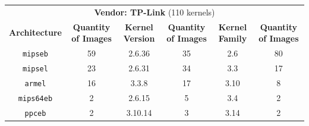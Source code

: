 \begin{table}[h]
{\begin{tabular}{cccccc}
\multicolumn{6}{c}{\textbf{Vendor: TP-Link} (110 kernels)}                                                                    \\
\textbf{Architecture} & \multicolumn{1}{c|}{\textbf{Quantity of Images}} & \textbf{Kernel Version} & \multicolumn{1}{c|}{\textbf{Quantity of Images}} & \textbf{Kernel Family} & \textbf{Quantity of Images} \\ \hline
{\tt mipseb}            & \multicolumn{1}{c|}{59}                & 2.6.36                  & \multicolumn{1}{c|}{35}                          & 2.6                     & 80                         \\
{\tt mipsel}            & \multicolumn{1}{c|}{23}                & 2.6.31                  & \multicolumn{1}{c|}{34}                          & 3.3                     & 17                         \\
{\tt armel}             & \multicolumn{1}{c|}{16}                & 3.3.8                   & \multicolumn{1}{c|}{17}                          & 3.10                    & 8                          \\
{\tt mips64eb}          & \multicolumn{1}{c|}{2}                 & 2.6.15                  & \multicolumn{1}{c|}{5}                           & 3.4                     & 2                          \\
{\tt ppceb}             & \multicolumn{1}{c|}{2}                 & 3.10.14                 & \multicolumn{1}{c|}{3}                           & 3.14                    & 2                          \\ \hline


\end{tabular}}
\end{table}
